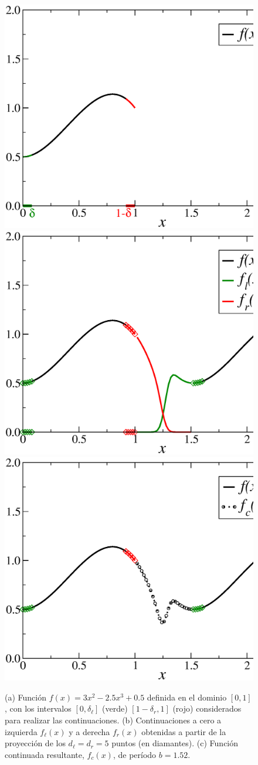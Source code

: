 \begin{figure}[h!]
\centering
  \includegraphics[width=0.5\linewidth]{figuras/fx.eps}\\
   \includegraphics[width=0.5\linewidth]{figuras/fx_contz.eps} \\
   \includegraphics[width=0.5\linewidth]{figuras/fx_cont.eps} 
  \caption{(a) 
  Función $f(x)=3x^2-2.5x^3+0.5$ definida en el dominio $[0,1]$, con los intervalos $[0,\delta_{\ell}]$ (verde) 
   $[1-\delta_r,1]$ (rojo) considerados
  para realizar las continuaciones. (b) Continuaciones a cero a izquierda $f_{\ell}(x)$ y a derecha $f_r(x)$
  obtenidas a partir de la proyección de los $d_{\ell}=d_r=5$ puntos (en diamantes). 
  (c) Función continuada resultante, $f_c(x)$, de período $b=1.52$.}
 \label{fig:Continuedf}
\end{figure}

